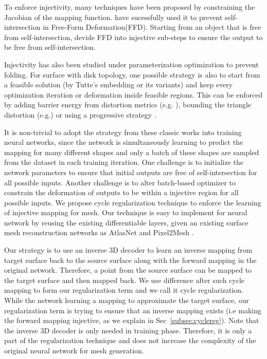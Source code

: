 To enforce injectivity, many techniques have been proposed by constraining the Jacobian of the mapping function. \cite{tvcgprevent} have sucessfully used it to prevent self-intersection in Free-Form Deformation(FFD). Starting from an object that is free from self-intersection, \cite{tvcgprevent} devide FFD into injective sub-steps to ensure the output to be free from self-intersection.

Injectivity has also been studied under parameterization optimization to prevent folding. For surface with disk topology, one possible strategy is also to start from a feasible solution (by Tutte's embedding \cite{tutte} or its variants) and keep every optimization iteration or deformation inside feasible regions. This can be enforced by adding barrier energy from distortion metrics (e.g. \cite{provableplanarmapping,lifted_bijection}), bounding the triangle distortion (e.g.\cite{freeboundary,boundeddistortion})
or using a progressive strategy \cite{Liu_PP_2018}. 

It is non-trivial to adopt the strategy from these classic works into training neural networks, since the network is simultaneously learning to predict the mapping for many different shapes and only a batch of these shapes are sampled from the dataset in each training iteration. One challenge is to initialize the network parameters to ensure that initial outputs are free of self-intersection for all possible inputs. Another challenge is to alter batch-based optimizer to constrain the deformation of outputs to be within a injective region for all possible inputs. We propose cycle regularization technique to enforce the learning of injective mapping for mesh. Our technique is easy to implement for neural network by reusing the existing differentiable layers, given an existing surface mesh reconstruction networks as AtlasNet \cite{atlasnet} and Pixel2Mesh \cite{pixel2mesh}.

 Our strategy is to use an inverse 3D decoder to learn an inverse mapping from target surface back to the source surface along with the forward mapping in the original network. Therefore, a point from the source surface can be mapped to the target surface and then mapped back. We use difference after such cycle mapping to form our regularization term and we call it cycle regularization. While the network learning a mapping to approximate the target surface, our regularization term is trying to ensure that an inverse mapping exists (i.e making the forward mapping injective, as we explain in Sec~\ref{subsec:cyclereg}).
Note that the inverse 3D decoder is only needed in training phase. Therefore, it is only a part of the regularization technique and does not increase the complexity of the original neural network for mesh generation.

